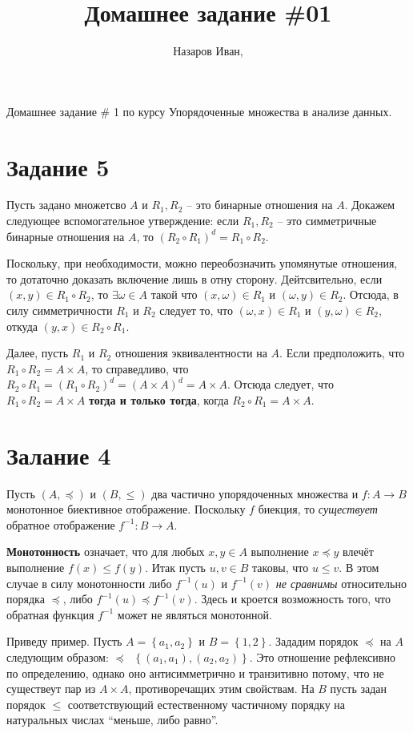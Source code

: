 \documentclass[a4paper]{article}
\title{Домашнее задание \#01}
\author{Назаров Иван, \rus{101мНОД(ИССА)}}
\newcommand{\obj}[1]{\left\{ #1 \right \}}
\newcommand{\brac}[1]{\left ( #1 \right )}
\newcommand{\defn}{\mathop{\overset{\Delta}{=}}\nolimits}
\begin{document}
\maketitle
\noindent Домашнее задание \# 1 по курсу Упорядоченные множества в анализе данных.

\section{Задание 5} %
\label{sec:task_5}
Пусть задано множетсво $A$ и $R_1, R_2$ -- это бинарные отношения на $A$. Докажем следующее вспомогательное утверждение: если $R_1, R_2$ -- это симметричные бинарные отношения на $A$, то $\brac{R_2\circ R_1}^d = R_1\circ R_2$.

Поскольку, при необходимости, можно переобозначить упомянутые отношения, то дотаточно доказать включение лишь в отну сторону. Дейтсвительно, если $\brac{x,y}\in R_1\circ R_2$, то $\exists \omega\in A$ такой что $\brac{x,\omega}\in R_1$ и $\brac{\omega,y}\in R_2$. Отсюда, в силу симметричности $R_1$ и $R_2$ следует то, что $\brac{\omega,x}\in R_1$ и $\brac{y,\omega}\in R_2$, откуда $\brac{y,x}\in R_2\circ R_1$.

Далее, пусть $R_1$ и $R_2$ отношения эквивалентности на $A$. Если предположить, что $R_1\circ R_2 = A\times A$, то справедливо, что $R_2\circ R_1 = \brac{R_1\circ R_2}^d = \brac{A\times A}^d = A\times A$. Отсюда следует, что $R_1\circ R_2 = A\times A$ \textbf{тогда и только тогда}, когда $R_2\circ R_1 = A\times A$.


\section{Залание 4} %
\label{sec:task_4}
Пусть $\brac{A,\preceq}$ и $\brac{B, \leq }$ два частично упорядоченных множества и $f:A\to B$ монотонное биективное отображение. Поскольку $f$ биекция, то \emph{существует} обратное отображение $f^{-1}:B\to A$.

\textbf{Монотонность} означает, что для любых $x,y\in A$ выполнение $x\preceq y$ влечёт выполнение $f(x)\leq f(y)$. Итак пусть $u,v\in B$ таковы, что $u\leq v$. В этом случае в силу монотонности либо $f^{-1}(u)$ и $f^{-1}(v)$ \emph{не сравнимы} относительно порядка $\preceq$, либо $f^{-1}(u)\preceq f^{-1}(v)$. Здесь и кроется возможность того, что обратная функция $f^{-1}$ может не являться монотонной.

Приведу пример. Пусть $A=\obj{a_1,a_2}$ и $B=\obj{1,2}$. Зададим порядок $\preceq$ на $A$ следующим образом: $\preceq \defn \obj{\brac{a_1, a_1}, \brac{a_2, a_2}}$. Это отношение рефлексивно по определению, однако оно антисимметрично и транзитивно потому, что не существеут пар из $A\times A$, противоречащих этим свойствам. На $B$ пусть задан порядок $\leq$ соответствующий естественному частичному порядку на натуральных числах ``меньше, либо равно''.
\end{document}
